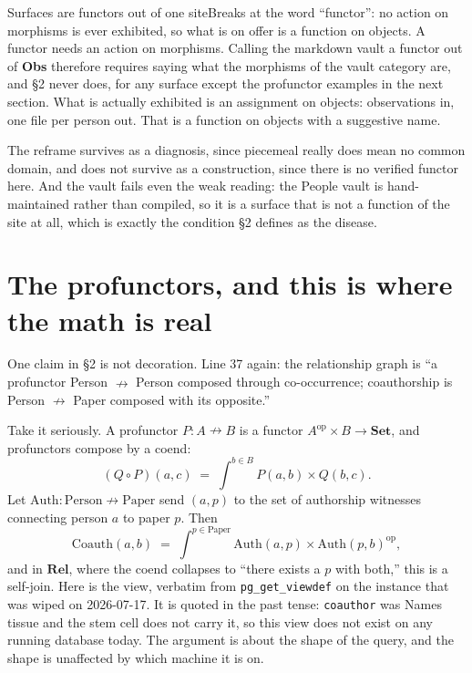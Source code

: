 \begin{Analogy}{Surfaces are functors out of one site}{Breaks at the word ``functor'': no action on morphisms is ever exhibited, so what is on offer is a function on objects.}
A functor needs an action on morphisms. Calling the markdown vault a functor out of \textbf{Obs} therefore requires saying what the morphisms of the vault category are, and \S2 never does, for any surface except the profunctor examples in the next section. What is actually exhibited is an assignment on objects: observations in, one file per person out. That is a function on objects with a suggestive name.

The reframe survives as a diagnosis, since piecemeal really does mean no common domain, and does not survive as a construction, since there is no verified functor here. And the vault fails even the weak reading: the People vault is hand-maintained rather than compiled, so it is a surface that is not a function of the site at all, which is exactly the condition \S2 defines as the disease.
\end{Analogy}

\section{The profunctors, and this is where the math is real}

One claim in \S2 is not decoration. Line 37 again: the relationship graph is ``a profunctor Person $\nrightarrow$ Person composed through co-occurrence; coauthorship is Person $\nrightarrow$ Paper composed with its opposite.''

Take it seriously. A profunctor $P: A \nrightarrow B$ is a functor $A^{\mathrm{op}} \times B \to \mathbf{Set}$, and profunctors compose by a coend:
\[
(Q \circ P)(a,c) \;=\; \int^{b \in B} P(a,b) \times Q(b,c).
\]
Let $\mathrm{Auth}: \mathrm{Person} \nrightarrow \mathrm{Paper}$ send $(a,p)$ to the set of authorship witnesses connecting person $a$ to paper $p$. Then
\[
\mathrm{Coauth}(a,b) \;=\; \int^{p \in \mathrm{Paper}} \mathrm{Auth}(a,p) \times \mathrm{Auth}(p,b)^{\mathrm{op}},
\]
and in $\mathbf{Rel}$, where the coend collapses to ``there exists a $p$ with both,'' this is a self-join. Here is the view, verbatim from \verb|pg_get_viewdef| on the instance that was wiped on 2026-07-17. It is quoted in the past tense: \texttt{coauthor} was Names tissue and the stem cell does not carry it, so this view does not exist on any running database today. The argument is about the shape of the query, and the shape is unaffected by which machine it is on.

